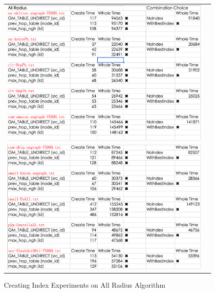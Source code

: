 \begin{figure}[H]
\begin{center}
\begin{tabular}{cc}
     \includegraphics[width=1.0\textwidth]{FIG/AllRadius1.png} \\
     \includegraphics[width=1.0\textwidth]{FIG/AllRadius2.png} \\
\end{tabular}
\caption{Creating Index Experiments on All Radius Algorithm}
\end{center}
\end{figure}

